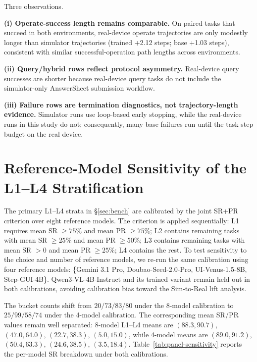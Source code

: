 \documentclass{llmxive}
\begin{document}
Three observations.

\textbf{(i) Operate-success length remains comparable.} On paired tasks that succeed in both environments, real-device operate trajectories are only modestly longer than simulator trajectories (trained +2.12 steps; base +1.03 steps), consistent with similar successful-operation path lengths across environments.

\textbf{(ii) Query/hybrid rows reflect protocol asymmetry.} Real-device query successes are shorter because real-device query tasks do not include the simulator-only AnswerSheet submission workflow.

\textbf{(iii) Failure rows are termination diagnostics, not trajectory-length evidence.} Simulator runs use loop-based early stopping, while the real-device runs in this study do not; consequently, many base failures run until the task step budget on the real device.


\section{Reference-Model Sensitivity of the L1--L4 Stratification}\label{app:panel-sensitivity}

The primary L1--L4 strata in §\ref{sec:bench} are calibrated by the joint SR+PR criterion over eight reference models. The criterion is applied sequentially: L1 requires mean SR $\geq75\%$ and mean PR $\geq75\%$; L2 contains remaining tasks with mean SR $\geq25\%$ and mean PR $\geq50\%$; L3 contains remaining tasks with mean SR $>0$ and mean PR $\geq25\%$; L4 contains the rest. To test sensitivity to the choice and number of reference models, we re-run the same calibration using four reference models: \{Gemini 3.1 Pro, Doubao-Seed-2.0-Pro, UI-Venus-1.5-8B, Step-GUI-4B\}. Qwen3-VL-4B-Instruct and its trained variant remain held out in both calibrations, avoiding calibration bias toward the Sim-to-Real lift analysis.

The bucket counts shift from $20/73/83/80$ under the 8-model calibration to $25/99/58/74$ under the 4-model calibration. The corresponding mean SR/PR values remain well separated: 8-model L1--L4 means are $(88.3,90.7)$, $(47.0,64.0)$, $(22.7,38.3)$, $(5.0,15.0)$, while 4-model means are $(89.0,91.2)$, $(50.4,63.3)$, $(24.6,38.5)$, $(3.5,18.4)$. Table~\ref{tab:panel-sensitivity} reports the per-model SR breakdown under both calibrations.
\end{document}
